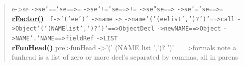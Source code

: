 {{{{{\begin{verse}
{\mbox{}\newline \phantom{ }e\phantom{ }-\textgreater \phantom{ }se}\mbox{}\newline
\texttt{\small \phantom{ }-\textgreater \phantom{ }se\phantom{ }'=='\phantom{ }se\phantom{ }==\textgreater \phantom{ }=}\mbox{}\newline
\texttt{\small \phantom{ }-\textgreater \phantom{ }se\phantom{ }'!='\phantom{ }se\phantom{ }==\textgreater \phantom{ }!=}\mbox{}\newline
\texttt{\small \phantom{ }-\textgreater \phantom{ }se\phantom{ }''\phantom{ }se\phantom{ }==\textgreater \phantom{ }}\mbox{}\newline
\texttt{\small \phantom{ }-\textgreater \phantom{ }se\phantom{ }'='\phantom{ }se\phantom{ }==\textgreater \phantom{ }=}
\\
\hyperlink{org.openmrs.module.dssmodule.parser.Parser.rFactor()}{{\bf rFactor()}} \texttt{\small
\mbox{}\newline \phantom{ }f\phantom{ }-\textgreater \phantom{ }'('\phantom{ }ee\phantom{ }')'}\mbox{}\newline
\texttt{\small \phantom{ }-\textgreater \phantom{ }name}\mbox{}\newline
\texttt{\small \phantom{ }-\textgreater \phantom{ }}\mbox{}\newline
\texttt{\small \phantom{ }-\textgreater \phantom{ }name\phantom{ }'('\phantom{ }(ee\phantom{ }list\phantom{ }',')?\phantom{ }')'\phantom{ }==\textgreater \phantom{ }call}\mbox{}\newline
\texttt{\small \phantom{ }-\textgreater \phantom{ }Object\phantom{ }'('\phantom{ }(NAME\phantom{ }list\phantom{ }',')?\phantom{ }')'\phantom{ }\phantom{ }\phantom{ }\phantom{ }==\textgreater \phantom{ }ObjectDecl}\mbox{}\newline
\texttt{\small \phantom{ }-\textgreater \phantom{ }new\phantom{ }NAME\phantom{ }\phantom{ }\phantom{ }\phantom{ }\phantom{ }\phantom{ }\phantom{ }\phantom{ }\phantom{ }\phantom{ }==\textgreater \phantom{ }Object}\mbox{}\newline
\texttt{\small \phantom{ }-\textgreater \phantom{ }NAME\phantom{ }'.'\phantom{ }NAME\phantom{ }\phantom{ }\phantom{ }\phantom{ }\phantom{ }==\textgreater \phantom{ }fieldRef}\mbox{}\newline
\texttt{\small \phantom{ }-\textgreater \phantom{ }LIST}
\\
\hyperlink{org.openmrs.module.dssmodule.parser.Parser.rFunHead()}{{\bf rFunHead()}} pre\textgreater  funHead -\textgreater  '(' (NAME list ',')? ')' ==\textgreater  formals note a funhead is a list of zero or more decl's separated by commas, all in parens\\

\end{verse}}}}}}
